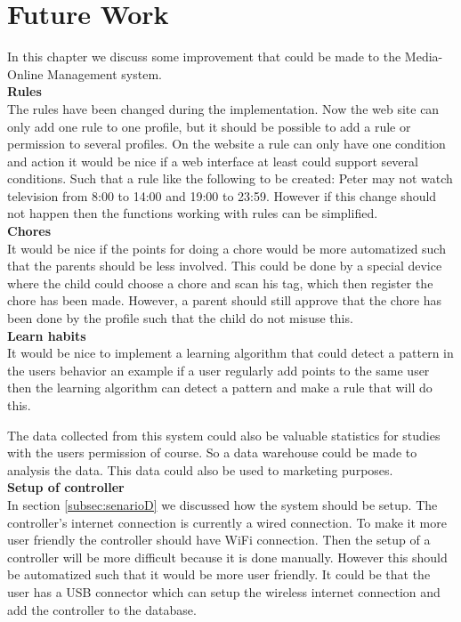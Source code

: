 \chapter{Future Work}
In this chapter we discuss some improvement that could be made to the Media-Online Management system.\\

\textbf{Rules}\\
The rules have been changed during the implementation. Now the web site can only add one rule to one profile, but it should be possible to add a rule or permission to several profiles. On the website a rule can only have one condition and action it would be nice if a web interface at least could support several conditions. Such that a rule like the following to be created: Peter may not watch television from 8:00 to 14:00 and 19:00 to 23:59. However if this change should not happen then the functions working with rules can be simplified. \\

\textbf{Chores}\\
It would be nice if the points for doing a chore would be more automatized such that the parents should be less involved. This could be done by a special device where the child could choose a chore and scan his tag, which then register the chore has been made. However, a parent should still approve that the chore has been done by the profile such that the child do not misuse this.\\

\textbf{Learn habits}\\
It would be nice to implement a learning algorithm that could detect a pattern in the users behavior an example if a user regularly add points to the same user then the learning algorithm can detect a pattern and make a rule that will do this. 

The data collected from this system could also be valuable statistics for studies with the users permission of course. So a data warehouse could be made to analysis the data. This data could also be used to marketing purposes. \\

\textbf{Setup of controller}\\
In section \vref{subsec:senarioD} we discussed how the system should be setup. The controller's internet connection is currently a wired connection. To make it more user friendly the controller should have WiFi connection. Then the setup of a controller will be more difficult because it is done manually. However this should be automatized such that it would be more user friendly. It could be that the user has a USB connector which can setup the wireless internet connection and add the controller to the database. 

